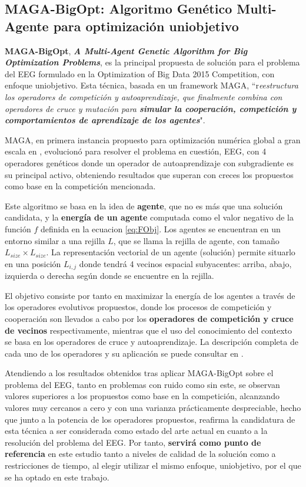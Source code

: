 \subsection{MAGA-BigOpt: Algoritmo Genético Multi-Agente para optimización uniobjetivo}

\textbf{MAGA-BigOpt}, \textbf{\textit{A Multi-Agent Genetic Algorithm for Big Optimization Problems}}\cite{MAGA-BigOpt}, es la principal propuesta de solución para el problema del EEG formulado en la Optimization of Big Data 2015 Competition, con enfoque uniobjetivo. Esta técnica, basada en un framework MAGA, ``r\textit{eestructura los operadores de competición y autoaprendizaje, que finalmente combina con operadores de cruce y mutación para \textbf{simular la cooperación, competición y comportamientos de aprendizaje de los agentes}}".

MAGA, en primera instancia propuesto para optimización numérica global a gran escala en\cite{MAGA} , evolucionó para resolver el problema en cuestión, EEG, con 4 operadores genéticos donde un operador de autoaprendizaje con subgradiente es su principal activo, obteniendo resultados que superan con creces los propuestos como base en la competición mencionada.

Este algoritmo se basa en la idea de \textbf{agente}, que no es más que una solución candidata, y la \textbf{energía de un agente} computada como el valor negativo de la función $f$ definida en la ecuacion \ref{eq:FObj}. Los agentes se encuentran en un entorno similar a una rejilla $L$, que se llama la rejilla de agente, con tamaño $L_{size}\times L_{size}$. La representación vectorial de un agente (solución) permite situarlo en una posición $L_{i,j}$ donde tendrá 4 vecinos espacial subyacentes: arriba, abajo, izquierda o derecha según donde se encuentre en la rejilla. 

El objetivo consiste por tanto en maximizar la energía de los agentes a través de los operadores evolutivos propuestos, donde los procesos de competición y cooperación son llevados a cabo por los \textbf{operadores de competición y cruce de vecinos} respectivamente, mientras que el uso del conocimiento del contexto se basa en los operadores de cruce y autoaprendizaje. La descripción completa de cada uno de los operadores y su aplicación se puede consultar en \cite{MAGA-BigOpt}.

Atendiendo a los resultados obtenidos tras aplicar MAGA-BigOpt sobre el problema del EEG, tanto en problemas con ruido como sin este, se observan valores superiores a los propuestos como base en la competición, alcanzando valores muy cercanos a cero y con una varianza prácticamente despreciable, hecho que junto a la potencia de los operadores propuestos, reafirma la candidatura de esta técnica a ser considerada como estado del arte actual en cuanto a la resolución del problema del EEG. Por tanto, \textbf{servirá como punto de referencia} en este estudio tanto a niveles de calidad de la solución como a restricciones de tiempo, al elegir utilizar el mismo enfoque, uniobjetivo, por el que se ha optado en este trabajo.


